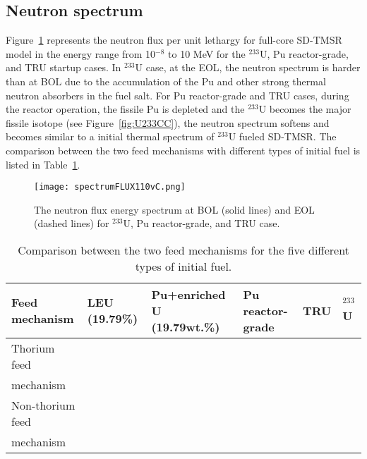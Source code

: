 \subsection{Neutron spectrum}
Figure~\ref{fig:spectrumFLUX110vC} represents the neutron flux per unit 
lethargy for full-core SD-TMSR model in the energy range from 10$^{-8}$ to 10 
MeV for the $^{233}$U, Pu reactor-grade, and TRU startup cases. In $^{233}$U 
case, at the EOL, the neutron spectrum is harder than at BOL due to the 
accumulation of the Pu and other strong thermal neutron absorbers in the fuel 
salt. For Pu reactor-grade and TRU cases, during the reactor operation, the 
fissile Pu is depleted and the $^{233}$U becomes the major fissile isotope 
(see Figure~\ref{fig:U233CC}), the neutron spectrum softens and becomes 
similar to a initial thermal spectrum of $^{233}$U fueled \gls{SD-TMSR}. The 
comparison between the two feed mechanisms with different types of initial 
fuel is listed in Table~\ref{tab:comp_feeds}. 
 \begin{figure}
 	\centering
 	\texttt{[image: spectrumFLUX110vC.png]}
 			\vspace{-0.4in}
 	\caption{The neutron flux energy spectrum at BOL (solid lines) and EOL (dashed lines) for $^{233}$U, Pu reactor-grade, and TRU case.}
 	\label{fig:spectrumFLUX110vC}
\end{figure}
\begin{table}  [!hb]
	\begin{minipage}{\linewidth}
		\renewcommand\footnoterule{}
		\renewcommand{\thefootnote}{\alph{footnote}}
	\caption{Comparison between the two feed mechanisms for the five different 
	types of initial fuel.}
		\label{tab:comp_feeds}
		\vspace{0.1in}
	\begin{tabularx}{\textwidth}{p{} X p{} 
	p{} X X 
	}  %
		\hline
		Feed mechanism & \gls{LEU} (19.79\%) & Pu+enriched U (19.79wt.\%) & Pu 
		reactor-grade & \gls{TRU}& $^{233}$U \\
		\hline
		Thorium feed\\ mechanism&\xmark&\xmark&\xmark&\xmark& \cmark \\
		Non-thorium feed\\ mechanism &\xmark&\xmark&\cmark\footnotemark[1] 
		&\cmark\footnotemark[2] & \xmark\footnotemark[3] \\
		\hline
	\end{tabularx}
			\vspace{-1.5ex}%
	\end{minipage}
\end{table}
\FloatBarrier

